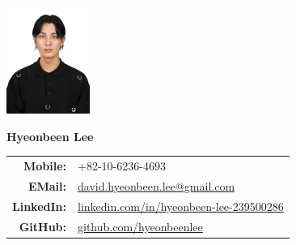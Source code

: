 \documentclass[a4paper,10pt]{extarticle}
\begin{document}
\pagestyle{empty}



\begin{minipage}{0.1\textwidth}
    \begin{flushleft}
        \includegraphics[height=3.5cm]{photo_231008.jpeg}
    \end{flushleft}
\end{minipage}
\hfill
\begin{minipage}{0.7\textwidth}
    \begin{flushright}
        \textbf{\Large Hyeonbeen Lee} %
        \newline\newline
        \begin{tabular}{rl}
            \textbf{Mobile: }   & +82-10-6236-4693                                                                                     \\
            \textbf{EMail: }    & \href{mailto:david.hyeonbeen.lee@gmail.com}{david.hyeonbeen.lee@gmail.com}                           \\
            \textbf{LinkedIn: } & \href{https://www.linkedin.com/in/hyeonbeen-lee-239500286/}{linkedin.com/in/hyeonbeen-lee-239500286} \\
            \textbf{GitHub: }   & \href{https://github.com/hyeonbeenlee}{github.com/hyeonbeenlee}                                      \\
        \end{tabular}
    \end{flushright}

\end{minipage}
\end{document}
